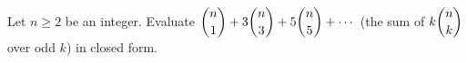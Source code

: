 Let $n\ge2$ be an integer. Evaluate $\dbinom n1+3\dbinom n3+5\dbinom n5+\cdots$ (the sum of $k\dbinom nk$ over odd $k$) in closed form.
